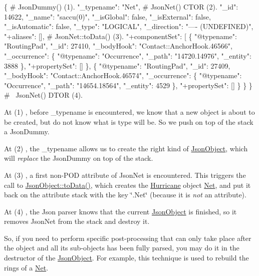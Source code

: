 \begin{DoxyCode}
\{                          # JsonDummy()  (1).
  "\_typename": "Net",      # JsonNet()  CTOR (2).
  "\_id": 14622,
  "\_name": "saccu(0)",
  "\_isGlobal": false,
  "\_isExternal": false,
  "\_isAutomatic": false,
  "\_type": "LOGICAL",
  "\_direction": "---- (UNDEFINED)",
  "+aliases": [],          # JsonNet::toData()  (3).
  "+componentSet": [
    \{
      "@typename": "RoutingPad",
      "\_id": 27410,
      "\_bodyHook": "Contact::AnchorHook.46566",
      "\_occurrence": \{
        "@typename": "Occurrence",
        "\_path": "14720.14976",
        "\_entity": 3888
      \},
      "+propertySet": []
    \},
    \{
      "@typename": "RoutingPad",
      "\_id": 27409,
      "\_bodyHook": "Contact::AnchorHook.46574",
      "\_occurrence": \{
        "@typename": "Occurrence",
        "\_path": "14654.18564",
        "\_entity": 4529
      \},
      "+propertySet": []
    \}
  \}
\}                          # ~JsonNet()  DTOR (4). 
\end{DoxyCode}


At {\ttfamily }(1) , before {\ttfamily \+\_\+typename} is encountered, we know that a new object is about to be created, but do not know what is type will be. So we push on top of the stack a {\ttfamily Json\+Dummy}.

At {\ttfamily }(2) , the {\ttfamily \+\_\+typename} allows us to create the right kind of \hyperlink{classHurricane_1_1JsonObject}{Json\+Object}, which will {\itshape replace} the {\ttfamily Json\+Dummy} on top of the stack.

At {\ttfamily }(3) , a first non-\/\+P\+OD attribute of Json\+Net is encountered. This triggers the call to {\ttfamily \hyperlink{classHurricane_1_1JsonObject_a57a845ca64ac8912b35c4dbf75723af6}{Json\+Object\+::to\+Data()}}, which creates the \hyperlink{namespaceHurricane}{Hurricane} object \hyperlink{classHurricane_1_1Net}{Net}, and put it back on the attribute stack with the key {\ttfamily \char`\"{}.\+Net\char`\"{}} (because it is {\itshape not} an attribute).

At {\ttfamily }(4) , the Json parser knows that the current \hyperlink{classHurricane_1_1JsonObject}{Json\+Object} is finished, so it removes Json\+Net from the stack and destroy it.

So, if you need to perform specific post-\/processing that can only take place {\ttfamily after} the object and all it\textquotesingle{}s sub-\/objects has been fully parsed, you may do it in the destructor of the \hyperlink{classHurricane_1_1JsonObject}{Json\+Object}. For example, this technique is used to rebuild the rings of a \hyperlink{classHurricane_1_1Net}{Net}. 